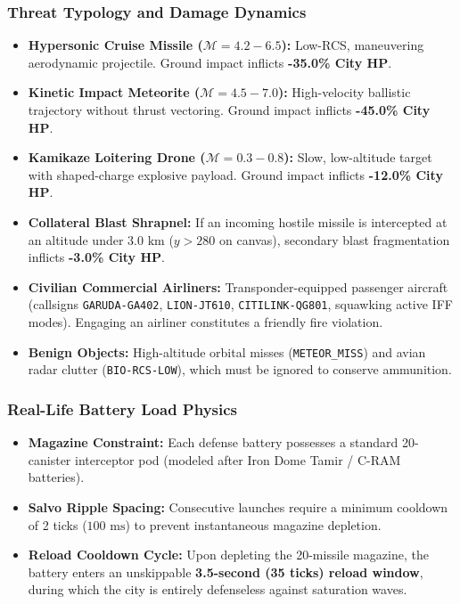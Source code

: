 \documentclass[journal,compsoc]{IEEEtran}
\begin{document}
\subsubsection{Threat Typology and Damage Dynamics}
\begin{itemize}
    \item \textbf{Hypersonic Cruise Missile ($\mathcal{M} = 4.2 - 6.5$):} Low-RCS, maneuvering aerodynamic projectile. Ground impact inflicts \textbf{-35.0\% City HP}.
    \item \textbf{Kinetic Impact Meteorite ($\mathcal{M} = 4.5 - 7.0$):} High-velocity ballistic trajectory without thrust vectoring. Ground impact inflicts \textbf{-45.0\% City HP}.
    \item \textbf{Kamikaze Loitering Drone ($\mathcal{M} = 0.3 - 0.8$):} Slow, low-altitude target with shaped-charge explosive payload. Ground impact inflicts \textbf{-12.0\% City HP}.
    \item \textbf{Collateral Blast Shrapnel:} If an incoming hostile missile is intercepted at an altitude under $3.0 \text{ km}$ ($y > 280$ on canvas), secondary blast fragmentation inflicts \textbf{-3.0\% City HP}.
    \item \textbf{Civilian Commercial Airliners:} Transponder-equipped passenger aircraft (callsigns \texttt{GARUDA-GA402}, \texttt{LION-JT610}, \texttt{CITILINK-QG801}, squawking active IFF modes). Engaging an airliner constitutes a friendly fire violation.
    \item \textbf{Benign Objects:} High-altitude orbital misses (\texttt{METEOR\_MISS}) and avian radar clutter (\texttt{BIO-RCS-LOW}), which must be ignored to conserve ammunition.
\end{itemize}

\subsubsection{Real-Life Battery Load Physics}
\begin{itemize}
    \item \textbf{Magazine Constraint:} Each defense battery possesses a standard 20-canister interceptor pod (modeled after Iron Dome Tamir / C-RAM batteries).
    \item \textbf{Salvo Ripple Spacing:} Consecutive launches require a minimum cooldown of 2 ticks ($100 \text{ ms}$) to prevent instantaneous magazine depletion.
    \item \textbf{Reload Cooldown Cycle:} Upon depleting the 20-missile magazine, the battery enters an unskippable \textbf{3.5-second (35 ticks) reload window}, during which the city is entirely defenseless against saturation waves.
\end{itemize}
\end{document}
